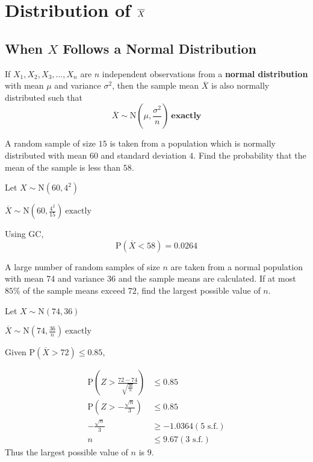 \documentclass[11pt,a4paper]{book}
\begin{document}
\section{Distribution of $\textbf{\ensuremath{\overline{X}}}$ }

\subsection{When $X$ Follows a Normal Distribution}

\begin{tcolorbox}[colback=blue!5, colframe=black, boxrule=.4pt, sharpish corners]

If $X_{1},X_{2},X_{3},...,X_{n}$ are $n$ independent observations
from a \textbf{normal distribution} with mean $\mu$ and variance
$\sigma^{2}$, then the sample mean $\overline{X}$ is also normally
distributed such that
\[
\overline{X}\sim\text{N}\left(\mu,\frac{\sigma^{2}}{n}\right)\:\textbf{exactly}
\]

\end{tcolorbox}

\begin{example}

A random sample of size $15$ is taken from a population which is
normally distributed with mean $60$ and standard deviation $4$.
Find the probability that the mean of the sample is less than $58$.

\Solution

Let ${\displaystyle X\sim\text{N}\left(60,4^{2}\right)}$

${\displaystyle \overline{X}\sim\text{N}\left(60,\frac{4^{2}}{15}\right)}\:\text{exactly}$

Using GC,
\[
\text{P}\left(\overline{X}<58\right)=0.0264
\]
\end{example}

\newpage

\begin{example}

A large number of random samples of size $n$ are taken from a normal
population with mean 74 and variance 36 and the sample means are calculated.
If at most $85\%$ of the sample means exceed $72$, find the largest
possible value of $n$.

\Solution

Let ${\displaystyle X\sim\text{N}\left(74,36\right)}$

${\displaystyle \overline{X}\sim\text{N}\left(74,\frac{36}{n}\right)}\:\text{exactly}$

Given $\text{P}\left(\overline{X}>72\right)\leq0.85$,

\begin{align*}
\text{P}\left(Z>\frac{72-74}{\sqrt{\frac{36}{n}}}\right) & \leq0.85\\
\text{P}\left(Z>-\frac{\sqrt{n}}{3}\right) & \leq0.85\\
-\frac{\sqrt{n}}{3} & \geq-1.0364(\text{5 s.f.})\\
n & \leq9.67(\text{3 s.f.})
\end{align*}
Thus the largest possible value of $n$ is $9$.

\end{example}
\end{document}
